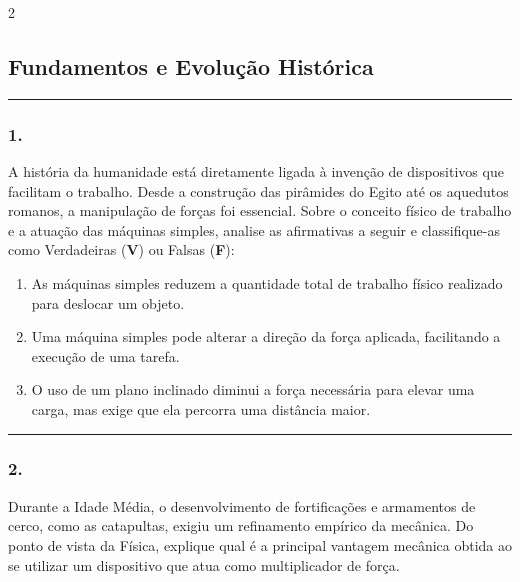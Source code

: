 \documentclass[twoside, 10pt, a4paper]{article}
\newlength{\espacoPosTitulo}
\newlength{\espacoPreQuestao}
\newlength{\espacoQuestao}
\newlength{\espacoAlt}
\begin{document}
\raggedcolumns
\begin{multicols*}{2}
\vspace{0.1cm}

\subsection*{Fundamentos e Evolução Histórica}
\vspace{-0.2cm}\noindent\rule{\linewidth}{1.5pt} 
\par\vspace{\espacoPosTitulo}
\subsubsection*{1.} A história da humanidade está diretamente ligada à invenção de dispositivos que facilitam o trabalho. Desde a construção das pirâmides do Egito até os aquedutos romanos, a manipulação de forças foi essencial. Sobre o conceito físico de trabalho e a atuação das máquinas simples, analise as afirmativas a seguir e classifique-as como Verdadeiras (\textbf{V}) ou Falsas (\textbf{F}):
\begin{enumerate}[label=\Roman*., itemsep=\espacoAlt]
    \item As máquinas simples reduzem a quantidade total de trabalho físico realizado para deslocar um objeto.
    \item Uma máquina simples pode alterar a direção da força aplicada, facilitando a execução de uma tarefa.
    \item O uso de um plano inclinado diminui a força necessária para elevar uma carga, mas exige que ela percorra uma distância maior.
\end{enumerate}
\par\vspace{\espacoQuestao}

\noindent\textcolor{CorLinha}{\rule{\linewidth}{0.5pt}} 
\par\vspace{\espacoPreQuestao}
\subsubsection*{2.} Durante a Idade Média, o desenvolvimento de fortificações e armamentos de cerco, como as catapultas, exigiu um refinamento empírico da mecânica. Do ponto de vista da Física, explique qual é a principal vantagem mecânica obtida ao se utilizar um dispositivo que atua como multiplicador de força.
\par\vspace{\espacoQuestao}


\end{multicols*}
\end{document}
